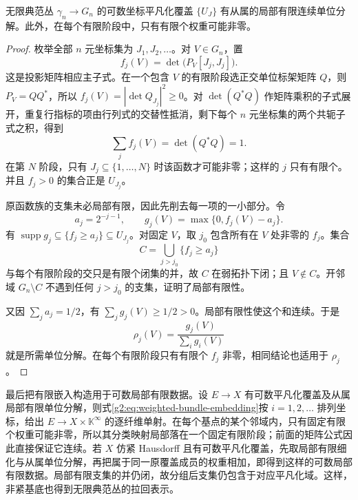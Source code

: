 \begin{lemma}\label{g2:lem:universal-numerable-cover}
	无限典范丛 \(\gamma_n\to G_n\) 的可数坐标平凡化覆盖 \(\{U_J\}\) 有从属的局部有限连续单位分解。此外，在每个有限阶段中，只有有限个权重可能非零。
\end{lemma}
\begin{proof}
	枚举全部 \(n\) 元坐标集为 \(J_1,J_2,\ldots\)。对 \(V\in G_n\)，置
	\[
		f_j(V)=\det\bigl(P_V[J_j,J_j]\bigr).
	\]
	这是投影矩阵相应主子式。在一个包含 \(V\) 的有限阶段选正交单位标架矩阵 \(Q\)，则 \(P_V=QQ^*\)，所以 \(f_j(V)=|\det Q_{J_j}|^2\ge0\)。对 \(\det(Q^*Q)\) 作矩阵乘积的子式展开，重复行指标的项由行列式的交替性抵消，剩下每个 \(n\) 元坐标集的两个共轭子式之积，得到
	\[
		\sum_j f_j(V)=\det(Q^*Q)=1.
	\]
	在第 \(N\) 阶段，只有 \(J_j\subseteq\{1,\ldots,N\}\) 时该函数才可能非零；这样的 \(j\) 只有有限个。并且 \(f_j>0\) 的集合正是 \(U_{J_j}\)。

	原函数族的支集未必局部有限，因此先削去每一项的一小部分。令
	\[
		a_j=2^{-j-1},\qquad g_j(V)=\max\{0,f_j(V)-a_j\}.
	\]
	有 \(\operatorname{supp}g_j\subseteq\{f_j\ge a_j\}\subseteq U_{J_j}\)。对固定 \(V\)，取 \(j_0\) 包含所有在 \(V\) 处非零的 \(f_j\)。集合
	\[
		C=\bigcup_{j>j_0}\{f_j\ge a_j\}
	\]
	与每个有限阶段的交只是有限个闭集的并，故 \(C\) 在弱拓扑下闭；且 \(V\notin C\)。开邻域 \(G_n\setminus C\) 不遇到任何 \(j>j_0\) 的支集，证明了局部有限性。

	又因 \(\sum_j a_j=1/2\)，有 \(\sum_jg_j(V)\ge1/2>0\)。局部有限性使这个和连续。于是
	\[
		\rho_j(V)=\frac{g_j(V)}{\sum_i g_i(V)}
	\]
	就是所需单位分解。在每个有限阶段只有有限个 \(f_j\) 非零，相同结论也适用于 \(\rho_j\)。
\end{proof}

最后把有限嵌入构造用于可数局部有限数据。设 \(E\to X\) 有可数平凡化覆盖及从属局部有限单位分解，则式\eqref{g2:eq:weighted-bundle-embedding}按 \(i=1,2,\ldots\) 排列坐标，给出 \(E\to X\times\mathbb K^\infty\) 的逐纤维单射。在每个基点的某个邻域内，只有固定有限个权重可能非零，所以其分类映射局部落在一个固定有限阶段；前面的矩阵公式因此直接保证它连续。若 \(X\) 仿紧 Hausdorff 且有可数平凡化覆盖，先取局部有限细化与从属单位分解，再把属于同一原覆盖成员的权重相加，即得到这样的可数局部有限数据。局部有限支集的并仍闭，故分组后支集仍包含于对应平凡化域。这样，非紧基底也得到无限典范丛的拉回表示。
